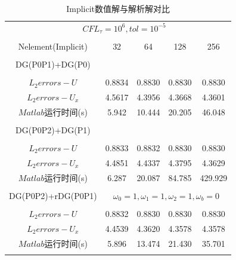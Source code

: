 \documentclass[a4paper,11pt,UTF8]{article}%
\theoremstyle{plain}
\begin{document}
	\begin{table}[H]
	\centering
	\caption{Implicit数值解与解析解对比}
	\label{tbl:table4}
	\begin{tabular}{cccccc}
		\Xhline{2pt}
		\multicolumn{2}{c}{$Re=\frac{|a|}{\nu}=10^6:a=10^4,\nu=0.01,x_0=0.5$}&\multicolumn{4}{c}{$CFL_\tau=10^6,tol=10^{-5}$}\\
		\Xhline{0.5pt}\\
		\multicolumn{2}{c}{Nelement(Implicit)}& 32& 64& 128& 256 \\
		\Xhline{0.5pt}\\
		
		\multicolumn{2}{c}{DG(P0P1)+DG(P0)} \\
		
		
		\Xcline{1-2}{0.4pt}\\
		\multicolumn{2}{c}{$L_2errors-{U}$}& 0.8834& 0.8830& 0.8830& 0.8830\\
		\multicolumn{2}{c}{$L_2errors-{U_x}$}&4.5617& 4.3956& 4.3668& 4.3601\\			
		\multicolumn{2}{c}{$Matlab$运行时间(s)}& 5.942& 10.444& 20.205& 46.048\\
		\\
		\multicolumn{2}{c}{DG(P0P2)+DG(P1)}\\
		\Xcline{1-2}{0.4pt}\\
		\multicolumn{2}{c}{$L_2errors-{U}$}& 0.8833& 0.8832&0.8830& 0.8830\\
		\multicolumn{2}{c}{$L_2errors-{U_x}$}& 4.4851&4.4337& 4.3795& 4.3629\\			
		\multicolumn{2}{c}{$Matlab$运行时间(s)}&6.287& 20.087& 84.785& 429.929\\
		\\
		\multicolumn{2}{c}{DG(P0P2)+rDG(P0P1)}&\multicolumn{4}{c}{$\omega_0=1,\omega_1=1,\omega_2=1,\omega_b=0$}\\
        \Xhline{0.4pt}\\
        \multicolumn{2}{c}{$L_2errors-{U}$}& 0.8832& 0.8830& 0.8830& 0.8830\\
        \multicolumn{2}{c}{$L_2errors-{U_x}$}& 4.4539&4.3620& 4.3578& 4.3578\\			
        \multicolumn{2}{c}{$Matlab$运行时间(s)}&5.896& 13.474& 21.430& 35.701\\		
		
		\Xhline{2pt}
	\end{tabular} 
\end{table}\leavevmode\\
\end{document}
